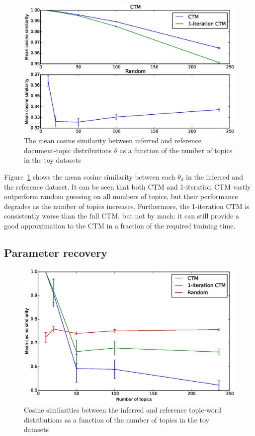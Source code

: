 \documentclass[12pt,a4paper,twoside,openright]{report}
\begin{document}
\begin{figure}[!htb]
\includegraphics[width=\textwidth]{sim-cosine.eps}
\caption{The mean cosine similarity between inferred and reference document-topic distributions $\theta$ as a function of the number of topics in the toy datasets}
\label{fig:sim-cosine}
\end{figure}

Figure~\ref{fig:sim-cosine} shows the mean cosine similarity between each $\theta_d$ in the inferred and the reference dataset. It can be seen that both CTM and 1-iteration CTM vastly outperform random guessing on all numbers of topics, but their performance degrades as the number of topics increases. Furthermore, the 1-iteration CTM is consistently worse than the full CTM, but not by much: it can still provide a good approximation to the CTM in a fraction of the required training time.

\subsection{Parameter recovery}

\begin{figure}[!htb]
\includegraphics[width=\textwidth]{sim-beta-cosine.eps}
\caption{Cosine similarities between the inferred and reference topic-word distributions as a function of the number of topics in the toy datasets}
\label{fig:sim-beta-cosine}
\end{figure}
\end{document}
